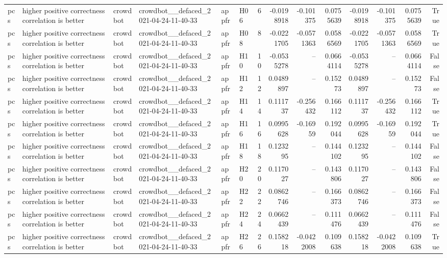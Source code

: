 \begin{longtable}{llllllrrrrrrrr}
pcs & higher positive correctness correlation is better & crowdbot & crowdbot\_\_defaced\_2021-04-24-11-40-33 & appfr & H06 & 6 & -0.0198918 & -0.101375 & 0.0755639 & -0.0198918 & -0.101375 & 0.0755639 & True \\
pcs & higher positive correctness correlation is better & crowdbot & crowdbot\_\_defaced\_2021-04-24-11-40-33 & appfr & H08 & 8 & -0.0221705 & -0.0571363 & 0.0586569 & -0.0221705 & -0.0571363 & 0.0586569 & True \\
pcs & higher positive correctness correlation is better & crowdbot & crowdbot\_\_defaced\_2021-04-24-11-40-33 & appfr & H10 & 10 & -0.0535278 & -- & 0.0664114 & -0.0535278 & -- & 0.0664114 & False \\
pcs & higher positive correctness correlation is better & crowdbot & crowdbot\_\_defaced\_2021-04-24-11-40-33 & appfr & H12 & 12 & 0.0489897 & -- & 0.15273 & 0.0489897 & -- & 0.15273 & False \\
pcs & higher positive correctness correlation is better & crowdbot & crowdbot\_\_defaced\_2021-04-24-11-40-33 & appfr & H14 & 14 & 0.111737 & -0.256432 & 0.166112 & 0.111737 & -0.256432 & 0.166112 & True \\
pcs & higher positive correctness correlation is better & crowdbot & crowdbot\_\_defaced\_2021-04-24-11-40-33 & appfr & H16 & 16 & 0.0995628 & -0.16959 & 0.192044 & 0.0995628 & -0.16959 & 0.192044 & True \\
pcs & higher positive correctness correlation is better & crowdbot & crowdbot\_\_defaced\_2021-04-24-11-40-33 & appfr & H18 & 18 & 0.123295 & -- & 0.144102 & 0.123295 & -- & 0.144102 & False \\
pcs & higher positive correctness correlation is better & crowdbot & crowdbot\_\_defaced\_2021-04-24-11-40-33 & appfr & H20 & 20 & 0.117027 & -- & 0.143806 & 0.117027 & -- & 0.143806 & False \\
pcs & higher positive correctness correlation is better & crowdbot & crowdbot\_\_defaced\_2021-04-24-11-40-33 & appfr & H22 & 22 & 0.0862746 & -- & 0.166373 & 0.0862746 & -- & 0.166373 & False \\
pcs & higher positive correctness correlation is better & crowdbot & crowdbot\_\_defaced\_2021-04-24-11-40-33 & appfr & H24 & 24 & 0.0662439 & -- & 0.111476 & 0.0662439 & -- & 0.111476 & False \\
pcs & higher positive correctness correlation is better & crowdbot & crowdbot\_\_defaced\_2021-04-24-11-40-33 & appfr & H26 & 26 & 0.158218 & -0.0422008 & 0.109638 & 0.158218 & -0.0422008 & 0.109638 & True \\

\end{longtable}
